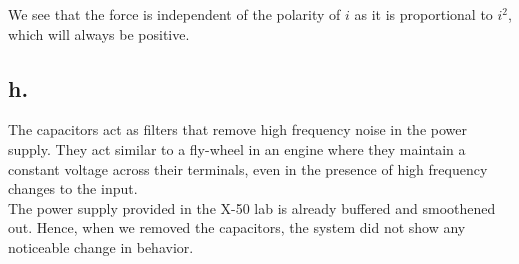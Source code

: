 \documentclass{article}
\theoremstyle{plain}
\theoremstyle{definition}
\theoremstyle{remark}
\begin{document}
We see that the force is independent of the polarity of $i$ as it is proportional to $i^2$, which will always be positive.


\subsection*{h.}
The capacitors act as filters that remove high frequency noise in the power supply. They act similar to a fly-wheel in an engine where they maintain a constant voltage across their terminals, even in the presence of high frequency changes to the input.\\

The power supply provided in the X-50 lab is already buffered and smoothened out. Hence, when we removed the capacitors, the system did not show any noticeable change in behavior.
\end{document}
